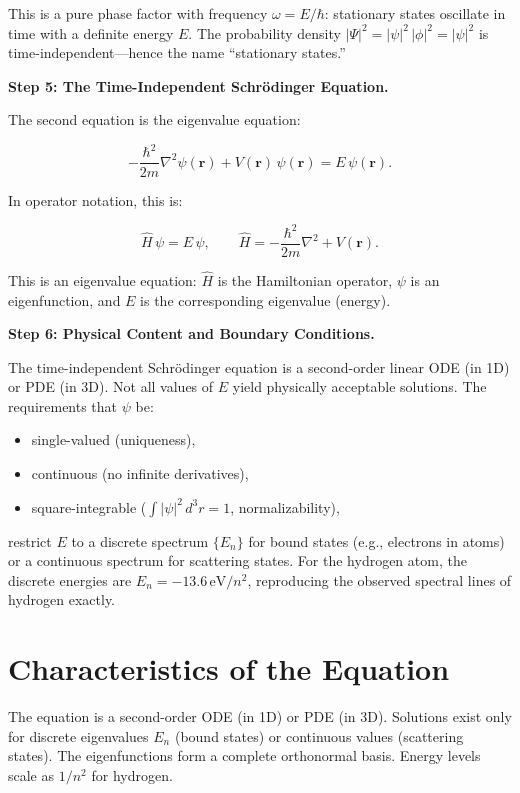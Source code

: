 This is a pure phase factor with frequency $\omega = E/\hbar$: stationary states oscillate in time with a definite energy $E$. The probability density $|\Psi|^2 = |\psi|^2\,|\phi|^2 = |\psi|^2$ is time-independent---hence the name ``stationary states.''

\textbf{Step 5: The Time-Independent Schr\"odinger Equation.}

The second equation is the eigenvalue equation:

\begin{equation}
-\frac{\hbar^2}{2m}\nabla^2\psi(\mathbf{r}) + V(\mathbf{r})\,\psi(\mathbf{r}) = E\,\psi(\mathbf{r}).
\end{equation}

In operator notation, this is:

\begin{equation}
\boxed{\hat{H}\,\psi = E\,\psi, \qquad \hat{H} = -\frac{\hbar^2}{2m}\nabla^2 + V(\mathbf{r}).}
\end{equation}

This is an eigenvalue equation: $\hat{H}$ is the Hamiltonian operator, $\psi$ is an eigenfunction, and $E$ is the corresponding eigenvalue (energy).

\textbf{Step 6: Physical Content and Boundary Conditions.}

The time-independent Schr\"odinger equation is a second-order linear ODE (in 1D) or PDE (in 3D). Not all values of $E$ yield physically acceptable solutions. The requirements that $\psi$ be:

\begin{itemize}
\item single-valued (uniqueness),
\item continuous (no infinite derivatives),
\item square-integrable ($\int |\psi|^2\,d^3r = 1$, normalizability),
\end{itemize}

restrict $E$ to a discrete spectrum $\{E_n\}$ for bound states (e.g., electrons in atoms) or a continuous spectrum for scattering states. For the hydrogen atom, the discrete energies are $E_n = -13.6\,\text{eV}/n^2$, reproducing the observed spectral lines of hydrogen exactly.

\section*{Characteristics of the Equation}

The equation is a second-order ODE (in 1D) or PDE (in 3D). Solutions exist only for discrete eigenvalues $E_n$ (bound states) or continuous values (scattering states). The eigenfunctions form a complete orthonormal basis. Energy levels scale as $1/n^2$ for hydrogen.
